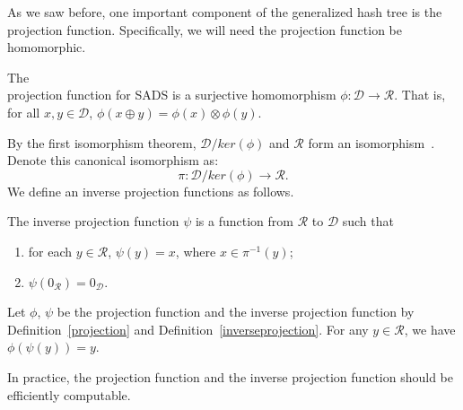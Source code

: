  As we saw before, one important component of the generalized hash tree is the projection function. Specifically, we will need the projection function be homomorphic.
\begin{defn}\label{projection}
The \\
projection function for SADS is a surjective homomorphism $\phi: {\mathcal{D}} \rightarrow {\mathcal{R}}$. That is, for all $x, y\in\mathcal{D}$, $\phi(x \oplus y) = \phi(x) \otimes \phi(y)$.
\end{defn}





By the first isomorphism theorem, ${\mathcal{D}} / ker(\phi)$ and ${\mathcal{R}}$ form an isomorphism~\cite{algebrabook}. Denote this canonical isomorphism as: $$\pi: {\mathcal{D}} / ker(\phi) \rightarrow {\mathcal{R}}.$$ We define an inverse projection functions as follows.
\begin{defn} \label{inverseprojection}
The inverse projection function $\psi$ is a function from ${\mathcal{R}}$ to ${\mathcal{D}}$ such that
\begin{enumerate}
\item for each $y \in {\mathcal{R}}$, $\psi(y) = x$, where $x \in \pi^{-1} (y)$;
\item $\psi(0_{\mathcal{R}}) = 0_{\mathcal{D}}$. 
\end{enumerate}
\end{defn}
 
 \begin{corol}\label{phipsi}
Let $\phi$, $\psi$ be the projection function and the inverse projection function by Definition~\ref{projection} and Definition~\ref{inverseprojection}. For any $y \in {\mathcal{R}}$, we have $\phi(\psi(y))=y$.
\end{corol}
 In practice, the projection function and the inverse projection function should be efficiently computable. 

